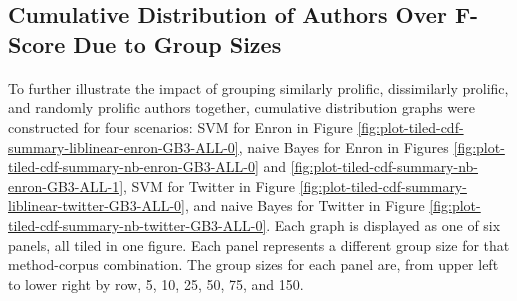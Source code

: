 \subsection{Cumulative Distribution of Authors Over F-Score Due to Group Sizes}
\begin{comment}\paragraph*{} Figures \ref{fig:plot-tiled-cdf-summary-liblinear-enron-GB3-ALL-0}, \ref{fig:plot-tiled-cdf-summary-nb-enron-GB3-ALL-0}, \ref{fig:plot-tiled-cdf-summary-nb-enron-GB3-ALL-1}, \ref{fig:plot-tiled-cdf-summary-nb-enron-GB3-ALL-1}, and \ref{fig:plot-tiled-cdf-summary-nb-twitter-GB3-ALL-0} all display the cumulative distribution of authors over f-score as group size is increased. There are six panels in each figure.  The panels progress from upper left to bottom right through group sizes 5, 10, 25, 50, 75, and 150.  To provide a consistent presentation, all of these figures except Figure \ref{fig:plot-tiled-cdf-summary-nb-enron-GB3-ALL-1} display a Web1T\% of 0 for feature type GB3. Figure \ref{fig:plot-tiled-cdf-summary-nb-enron-GB3-ALL-1} displays a Web1T\% of 1 for feature type GB3 to present the difference in curvature between naive Bayes against Enron for both Web1T\% of 0 (Figure \ref{fig:plot-tiled-cdf-summary-nb-enron-GB3-ALL-0}) and a Web1T\% of 1 (Figure \ref{fig:plot-tiled-cdf-summary-nb-enron-GB3-ALL-1}).
\end{comment}
	\paragraph*{} To further illustrate the impact of grouping similarly prolific, dissimilarly prolific, and randomly prolific authors together, cumulative distribution graphs were constructed for four scenarios: SVM for Enron in Figure \ref{fig:plot-tiled-cdf-summary-liblinear-enron-GB3-ALL-0}, naive Bayes for Enron in Figures \ref{fig:plot-tiled-cdf-summary-nb-enron-GB3-ALL-0} and \ref{fig:plot-tiled-cdf-summary-nb-enron-GB3-ALL-1}, SVM for Twitter in Figure \ref{fig:plot-tiled-cdf-summary-liblinear-twitter-GB3-ALL-0}, and naive Bayes for Twitter in Figure \ref{fig:plot-tiled-cdf-summary-nb-twitter-GB3-ALL-0}.  Each graph is displayed as one of six panels, all tiled in one figure.  Each panel represents a different group size for that method-corpus combination.  The group sizes for each panel are, from upper left to lower right by row, 5, 10, 25, 50, 75, and 150.  
